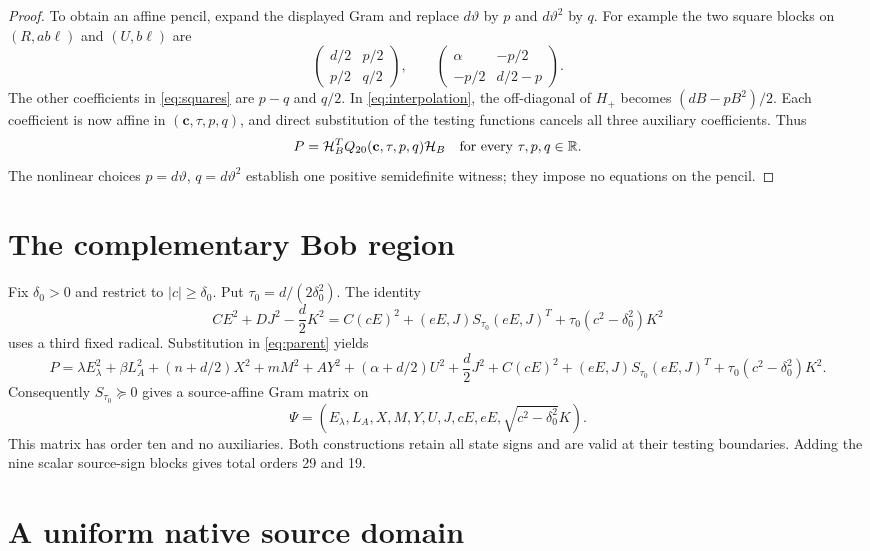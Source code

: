 \documentclass[10pt]{article}
\newcommand{\R}{\mathbb R}
\begin{document}
\begin{proof}
To obtain an affine pencil, expand the displayed Gram and replace
$d\vartheta$ by $p$ and $d\vartheta^2$ by $q$.
For example the two square blocks on $(R,ab\ell)$ and $(U,b\ell)$ are
\[
 \begin{pmatrix}d/2&p/2\\p/2&q/2\end{pmatrix},
 \qquad
 \begin{pmatrix}\alpha&-p/2\\-p/2&d/2-p\end{pmatrix}.
\]
The other coefficients in \eqref{eq:squares} are $p-q$ and $q/2$.
In \eqref{eq:interpolation}, the off-diagonal of $H_+$ becomes
$(dB-pB^2)/2$. Each coefficient is now affine in
$(\mathbf c,\tau,p,q)$, and direct substitution of the testing functions
cancels all three auxiliary coefficients. Thus
\[
 P=\mathcal H_B^TQ_{20}(\mathbf c,\tau,p,q)\mathcal H_B
 \quad\hbox{for every }\tau,p,q\in\R.
\]
The nonlinear choices $p=d\vartheta$, $q=d\vartheta^2$ establish one
positive semidefinite witness; they impose no equations on the pencil.
\end{proof}

\section{The complementary Bob region}

Fix $\delta_0>0$ and restrict to $|c|\geq\delta_0$. Put
$\tau_0=d/(2\delta_0^2)$. The identity
\[
 CE^2+DJ^2-\frac d2K^2
 =C(cE)^2+(eE,J)S_{\tau_0}(eE,J)^T
    +\tau_0(c^2-\delta_0^2)K^2
\]
uses a third fixed radical. Substitution in \eqref{eq:parent} yields
\[
 P=\lambda E_\lambda^2+\beta L_A^2+(n+d/2)X^2+mM^2+AY^2
 +(\alpha+d/2)U^2+\frac d2J^2
 +C(cE)^2+(eE,J)S_{\tau_0}(eE,J)^T
 +\tau_0(c^2-\delta_0^2)K^2.
\]
Consequently $S_{\tau_0}\succeq0$ gives a source-affine Gram matrix on
\[
 \Psi=(E_\lambda,L_A,X,M,Y,U,J,cE,eE,
                     \sqrt{c^2-\delta_0^2}K).
\]
This matrix has order ten and no auxiliaries. Both constructions retain
all state signs and are valid at their testing boundaries. Adding the
nine scalar source-sign blocks gives total orders 29 and 19.

\section{A uniform native source domain}
\end{document}
